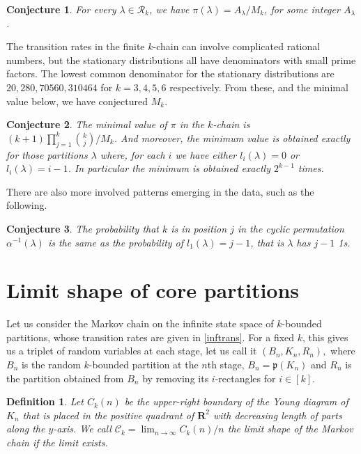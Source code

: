 \documentclass[11pt]{amsart}
\newtheorem{definition}[theorem]{Definition}
\newtheorem{conjecture}{Conjecture}[]
\begin{document}
\begin{conjecture}\label{conj:lcd} For every $\lambda \in \mathcal{R}_k$, we have 
$\pi(\lambda)=A_\lambda/M_k$, for some integer $A_\lambda$.
\end{conjecture}

The transition rates in the finite $k$-chain can involve complicated rational numbers, but the stationary distributions all have denominators with small prime factors. The lowest common denominator for the stationary distributions are $20,280,70560, 310464$ for $k=3,4,5,6$ respectively. From these, and the minimal value below, we have conjectured $M_k$.
\begin{conjecture} \label{conj:minimum}
The minimal value of $\pi$ in the $k$-chain is $(k+1)\prod_{j=1}^k\binom{k}{j}/M_k$.
And moreover, the minimum value is obtained exactly for those partitions $\lambda$ where, for each $i$ we have either $l_i(\lambda)=0$ or $l_i(\lambda)=i-1$. In particular the minimum is obtained exactly $2^{k-1}$ times.
\end{conjecture}

There are also more involved patterns emerging in the data, such as the following.

\begin{conjecture}
The probability that $k$ is in position $j$ in the cyclic permutation $\alpha^{-1}(\lambda)$ is the same as the probability of  $l_1(\lambda)=j-1$, that is $\lambda$ has $j-1$ 1s.
\end{conjecture}


\section{Limit shape of core partitions}\label{sect:lim}
Let us consider the Markov chain on the infinite state space of $k$-bounded partitions, whose transition rates are given in \eqref{inftrans}. For a fixed $k$, this gives us a triplet of random variables at each stage, let us call it $(B_n,K_n,R_n),$ where $B_n$ is the random $k$-bounded partition at the $n$th stage, $B_n = \mathfrak{p}(K_n)$ and $R_n$ is the partition obtained from $B_n$ by removing its $i$-rectangles for $i\in [k].$ 
\begin{definition}
   Let $C_k(n)$ be the upper-right boundary of the Young diagram of $K_n$ that is placed in the positive quadrant of $\mathbf{R}^2$ with decreasing length of parts along the $y$-axis. We call  $\mathcal{C}_{k}=\lim_{n\rightarrow \infty} C_k(n)/n$  the \textnormal{limit shape} of the Markov chain if the limit exists.
\end{definition}
\end{document}
